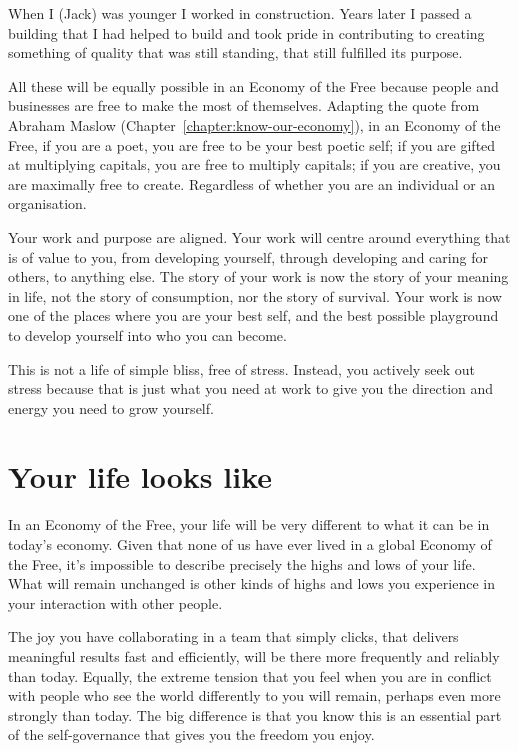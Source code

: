 \begin{longstoryblock}
When I (Jack) was younger I worked in construction. Years later I passed a building that I had helped to build and took pride in contributing to creating something of quality that was still standing, that still fulfilled its purpose. 
\end{longstoryblock}


All these will be equally possible in an Economy of the Free  because people and businesses are free to make the most of themselves. Adapting the quote from Abraham Maslow  (Chapter~\ref{chapter:know-our-economy}), in an Economy of the Free, if you are a poet, you are free to be your best poetic self; if you are gifted at multiplying capitals, you are free to multiply capitals; if you are creative, you are maximally free to create. Regardless of whether you are an individual or an organisation. 


Your work and purpose are aligned. Your work will centre around everything that is of value to you, from developing yourself, through developing and caring for others, to anything else. The story of your work is now the story of your meaning in life, not the story of consumption, nor the story of survival. Your work is now one of the places where you are your best self, and the best possible playground to develop yourself into who you can become.


This is not a life of simple bliss, free of stress. Instead, you actively seek out stress because that is just what you need at work to give you the direction and energy you need to grow yourself. 
\section{Your life looks like}
In an Economy of the Free, your life will be very different to what it can be in today's economy. Given that none of us have ever lived in a global Economy of the Free, it's impossible to describe precisely the highs and lows of your life. What will remain unchanged is other kinds of highs and lows you experience in your interaction with other people.


The joy you have collaborating in a team that simply clicks, that delivers meaningful results fast and efficiently, will be there more frequently and reliably than today. Equally, the extreme tension that you feel when you are in conflict with people who see the world differently to you will remain, perhaps even more strongly than today. The big difference is that you know this is an essential part of the self-governance that gives you the freedom you enjoy.


